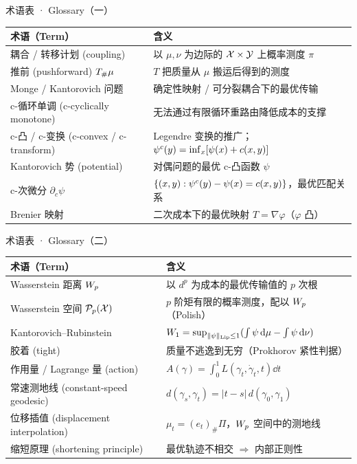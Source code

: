 \begin{frame}{术语表 · Glossary（一）}
  \begin{center}\small
  \begin{tabular}{ll}
    \toprule
    \textbf{术语（Term）} & \textbf{含义} \\
    \midrule
    耦合 / 转移计划 (coupling) & 以 $\mu,\nu$ 为边际的 $\mathcal{X}\times\mathcal{Y}$ 上概率测度 $\pi$ \\
    推前 (pushforward) ${T}_{\#}\mu$ & $T$ 把质量从 $\mu$ 搬运后得到的测度 \\
    Monge / Kantorovich 问题 & 确定性映射 / 可分裂耦合下的最优传输 \\
    c-循环单调 (c-cyclically monotone) & 无法通过有限循环重路由降低成本的支撑 \\
    c-凸 / c-变换 (c-convex / c-transform) & Legendre 变换的推广；${\psi}^{c}(y)=\inf_x[\psi(x)+c(x,y)]$ \\
    Kantorovich 势 (potential) & 对偶问题的最优 c-凸函数 $\psi$ \\
    c-次微分 $\partial_c\psi$ & $\{(x,y):{\psi}^{c}(y)-\psi(x)=c(x,y)\}$，最优匹配关系 \\
    Brenier 映射 & 二次成本下的最优映射 $T=\nabla\varphi$（$\varphi$ 凸） \\
    \bottomrule
  \end{tabular}
  \end{center}
\end{frame}

\begin{frame}{术语表 · Glossary（二）}
  \begin{center}\small
  \begin{tabular}{ll}
    \toprule
    \textbf{术语（Term）} & \textbf{含义} \\
    \midrule
    Wasserstein 距离 $W_{p}$ & 以 $d^p$ 为成本的最优传输值的 $p$ 次根 \\
    Wasserstein 空间 $\mathcal{P}_{p}(\mathcal{X})$ & $p$ 阶矩有限的概率测度，配以 $W_{p}$（Polish） \\
    Kantorovich–Rubinstein & $W_{1}=\sup_{\lVert \psi\rVert_{\mathrm{Lip}}\le1}(\int\psi\,\mathrm{d}\mu-\int\psi\,\mathrm{d}\nu)$ \\
    胶着 (tight) & 质量不逃逸到无穷（Prokhorov 紧性判据） \\
    作用量 / Lagrange 量 (action) & $A(\gamma)=\int_0^1 L(\gamma_t,\dot\gamma_t,t)\dd t$ \\
    常速测地线 (constant-speed geodesic) & $d(\gamma_s,\gamma_t)=|t-s|\,d(\gamma_0,\gamma_1)$ \\
    位移插值 (displacement interpolation) & $\mu_t=(e_t)_\#\Pi$，$W_{p}$ 空间中的测地线 \\
    缩短原理 (shortening principle) & 最优轨迹不相交 $\Rightarrow$ 内部正则性 \\
    \bottomrule
  \end{tabular}
  \end{center}
\end{frame}

